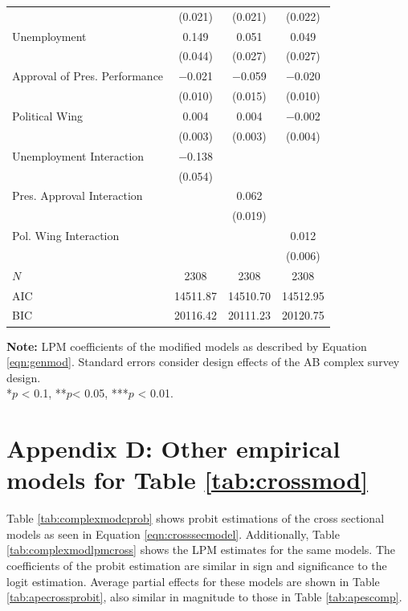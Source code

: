 \documentclass[12pt,a4]{article}\usepackage[]{graphicx}\usepackage[]{xcolor}
\begin{document}
\begin{table}[htbp]
\begin{center}
\begin{tabular}[t]{lccc}
 & (\num{0.021}) & (\num{0.021}) & (\num{0.022})\\
Unemployment & \num{0.149} & \num{0.051} & \num{0.049}\\
 & (\num{0.044}) & (\num{0.027}) & (\num{0.027})\\
Approval of Pres. Performance & \num{-0.021} & \num{-0.059} & \num{-0.020}\\
 & (\num{0.010}) & (\num{0.015}) & (\num{0.010})\\
Political Wing & \num{0.004} & \num{0.004} & \num{-0.002}\\
 & (\num{0.003}) & (\num{0.003}) & (\num{0.004})\\
Unemployment Interaction & \num{-0.138} &  & \\
 & (\num{0.054}) &  & \\
Pres. Approval Interaction &  & \num{0.062} & \\
 &  & (\num{0.019}) & \\
Pol. Wing Interaction &  &  & \num{0.012}\\
 &  &  & (\num{0.006})\\
\midrule
$N$ & \num{2308} & \num{2308} & \num{2308}\\
AIC & \num{14511.87} & \num{14510.70} & \num{14512.95}\\
BIC & \num{20116.42} & \num{20111.23} & \num{20120.75}\\
\bottomrule
\end{tabular}


\end{center}
\textbf{Note:} LPM coefficients of the modified models as described by Equation \ref{eqn:genmod}. Standard errors consider design effects of the AB complex survey design.\\
*$p$ < 0.1, **$p$< 0.05, ***$p$ < 0.01.
\end{table}




\section{Appendix D: Other empirical models for Table \ref{tab:crossmod}}

Table \ref{tab:complexmodcprob} shows probit estimations of the cross sectional models as seen in Equation \ref{eqn:crosssecmodel}. Additionally, Table \ref{tab:complexmodlpmcross} shows the LPM estimates for the same models. The coefficients of the probit estimation are similar in sign and significance to the logit estimation. Average partial effects for these models are shown in Table \ref{tab:apecrossprobit}, also similar in magnitude to those in Table \ref{tab:apescomp}.
\end{document}
